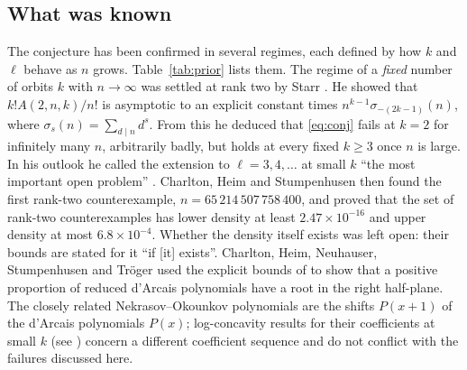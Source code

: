\documentclass[11pt,a4paper]{article}
\theoremstyle{remark}
\numberwithin{equation}{section}
\begin{document}
\subsection{What was known}
The conjecture has been confirmed in several regimes, each defined by how $k$ and $\ell$ behave as $n$ grows. Table~\ref{tab:prior} lists them. The regime of a \emph{fixed} number of orbits $k$ with $n\to\infty$ was settled at rank two by Starr \cite{Starr2026a}. He showed that $k!A(2,n,k)/n!$ is asymptotic to an explicit constant times $n^{k-1}\sigma_{-(2k-1)}(n)$, where $\sigma_s(n)=\sum_{d\mid n}d^s$. From this he deduced that \eqref{eq:conj} fails at $k=2$ for infinitely many $n$, arbitrarily badly, but holds at every fixed $k\ge3$ once $n$ is large. In his outlook he called the extension to $\ell=3,4,\dots$ at small $k$ ``the most important open problem'' \cite[Section~5]{Starr2026a}. Charlton, Heim and Stumpenhusen \cite{CHS2026} then found the first rank-two counterexample, $n=65\,214\,507\,758\,400$, and proved that the set of rank-two counterexamples has lower density at least $2.47\times10^{-16}$ and upper density at most $6.8\times10^{-4}$. Whether the density itself exists was left open: their bounds are stated for it ``if [it] exists''. Charlton, Heim, Neuhauser, Stumpenhusen and Tr\"oger \cite{CHNST2026} used the explicit bounds of \cite{CHS2026} to show that a positive proportion of reduced d'Arcais polynomials have a root in the right half-plane. The closely related Nekrasov--Okounkov polynomials are the shifts $P(x+1)$ of the d'Arcais polynomials $P(x)$; log-concavity results for their coefficients at small $k$ (see \cite[Remark~2.5]{Starr2026a}) concern a different coefficient sequence and do not conflict with the failures discussed here.
\end{document}
